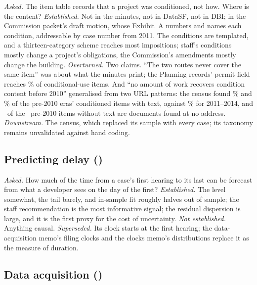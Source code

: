\documentclass[11pt]{article}
\begin{document}
\textit{Asked.} The item table records that a project was conditioned, not how. Where is the
content? \textit{Established.} Not in the minutes, not in DataSF, not in DBI; in the Commission
packet's draft motion, whose Exhibit~A numbers and names each condition, addressable by case
number from 2011. The conditions are templated, and a thirteen-category scheme reaches most
impositions; staff's conditions mostly change a project's obligations, the Commission's
amendments mostly change the building. \textit{Overturned.} Two claims. ``The two routes never
cover the same item'' was about what the minutes print; the Planning records' permit field reaches
\condBridgeCUPct\% of conditional-use items. And ``no amount of work recovers condition content
before 2010'' generalised from two URL patterns: the census found \condReachEarlyHtml\% and
\condReachLateHtml\% of the pre-2010 eras' conditioned items with text, against \condReachEarlyPdf\%
for 2011--2014, and \condResPreTenNone\ of the \condResPreTen\ pre-2010 items without text are
documents found at no address. \textit{Downstream.} The census, which replaced its sample with every case; its taxonomy
remains unvalidated against hand coding.

\subsection{Predicting delay (\chDatePredictingDelay)}\label{sec:chpredictingdelay}

\textit{Asked.} How much of the time from a case's first hearing to its last can be forecast from
what a developer sees on the day of the first? \textit{Established.} The level somewhat, the
tail barely, and in-sample fit roughly halves out of sample; the staff recommendation is the most
informative signal; the residual dispersion is large, and it is the first proxy for the cost of
uncertainty. \textit{Not established.} Anything causal. \textit{Superseded.} Its clock starts at
the first hearing; the data-acquisition memo's filing clocks and the clocks memo's distributions
replace it as the measure of duration.

\subsection{Data acquisition (\chDateDataAcquisition)}\label{sec:chdataacquisition}
\end{document}
